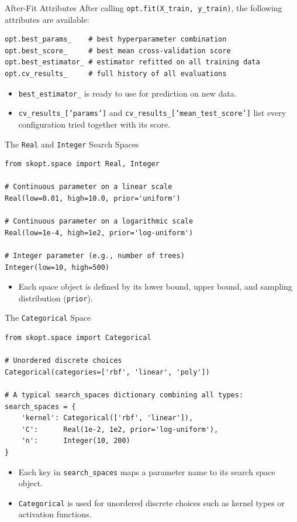 \documentclass{beamer}
\begin{document}
\begin{frame}[fragile]{After-Fit Attributes}
  After calling \texttt{opt.fit(X\_train, y\_train)}, the following attributes are available:
  \begin{lstlisting}
opt.best_params_    # best hyperparameter combination
opt.best_score_     # best mean cross-validation score
opt.best_estimator_ # estimator refitted on all training data
opt.cv_results_     # full history of all evaluations
  \end{lstlisting}
  \begin{itemize}
    \item \texttt{best\_estimator\_} is ready to use for prediction on new data.
    \item \texttt{cv\_results\_['params']} and \texttt{cv\_results\_['mean\_test\_score']} list every configuration tried together with its score.
  \end{itemize}
\end{frame}

\begin{frame}[fragile]{The \texttt{Real} and \texttt{Integer} Search Spaces}
  \begin{lstlisting}
from skopt.space import Real, Integer

# Continuous parameter on a linear scale
Real(low=0.01, high=10.0, prior='uniform')

# Continuous parameter on a logarithmic scale
Real(low=1e-4, high=1e2, prior='log-uniform')

# Integer parameter (e.g., number of trees)
Integer(low=10, high=500)
  \end{lstlisting}
  \begin{itemize}
    \item Each space object is defined by its lower bound, upper bound, and sampling distribution (\texttt{prior}).
  \end{itemize}
\end{frame}

\begin{frame}[fragile]{The \texttt{Categorical} Space}
  \begin{lstlisting}
from skopt.space import Categorical

# Unordered discrete choices
Categorical(categories=['rbf', 'linear', 'poly'])

# A typical search_spaces dictionary combining all types:
search_spaces = {
    'kernel': Categorical(['rbf', 'linear']),
    'C':      Real(1e-2, 1e2, prior='log-uniform'),
    'n':      Integer(10, 200)
}
  \end{lstlisting}
  \begin{itemize}
    \item Each key in \texttt{search\_spaces} maps a parameter name to its search space object.
    \item \texttt{Categorical} is used for unordered discrete choices such as kernel types or activation functions.
  \end{itemize}
\end{frame}
\end{document}

